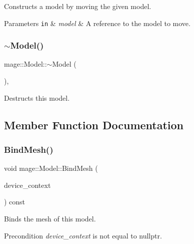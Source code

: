 Constructs a model by moving the given model.


\begin{DoxyParams}[1]{Parameters}
\mbox{\tt in}  & {\em model} & A reference to the model to move. \\
\hline
\end{DoxyParams}
\hypertarget{classmage_1_1_model_af9f45ed2dcf470f85bbfd144ca9857a7}{}\label{classmage_1_1_model_af9f45ed2dcf470f85bbfd144ca9857a7} 
\subsubsection{\texorpdfstring{$\sim$\+Model()}{~Model()}}
{\footnotesize\ttfamily mage\+::\+Model\+::$\sim$\+Model (\begin{DoxyParamCaption}{ }\end{DoxyParamCaption})\hspace{0.3cm}{\ttfamily [virtual]}, {\ttfamily [default]}}

Destructs this model. 

\subsection{Member Function Documentation}
\hypertarget{classmage_1_1_model_a0ee2a2b1bed4600f052af46ffcf12884}{}\label{classmage_1_1_model_a0ee2a2b1bed4600f052af46ffcf12884} 
\subsubsection{\texorpdfstring{Bind\+Mesh()}{BindMesh()}\hspace{0.1cm}{\footnotesize\ttfamily [1/2]}}
{\footnotesize\ttfamily void mage\+::\+Model\+::\+Bind\+Mesh (\begin{DoxyParamCaption}\item[{I\+D3\+D11\+Device\+Context4 $\ast$}]{device\+\_\+context }\end{DoxyParamCaption}) const\hspace{0.3cm}{\ttfamily [noexcept]}}

Binds the mesh of this model.

\begin{DoxyPrecond}{Precondition}
{\itshape device\+\_\+context} is not equal to {\ttfamily nullptr}. 
\end{DoxyPrecond}

